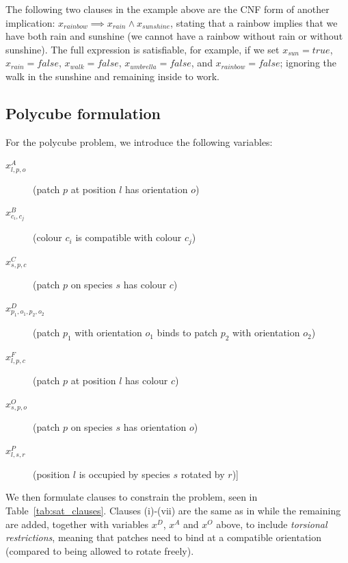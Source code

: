 The following two clauses in the example above are the CNF form of another implication: \(x_{rainbow} \implies  x_{rain} \land x_{sunshine}\), stating that a rainbow implies that we have both rain and sunshine (we cannot have a rainbow without rain or without sunshine). The full expression is satisfiable, for example, if we set \(x_{sun}=true\), \(x_{rain}=false\), \(x_{walk}=false\), \(x_{umbrella}=false\), and \(x_{rainbow}=false\); ignoring the walk in the sunshine and remaining inside to work.

\subsection{Polycube formulation}

For the polycube problem, we introduce the following variables:
\begin{description}
    \item[\(x_{l,p,o}^{A}\)] (patch \(p\) at position \(l\) has orientation \(o\))
    \item[\(x_{c_i,c_j}^{B}\)] (colour \(c_i\) is compatible with colour \(c_j\))
    \item[\(x_{s,p,c}^{C}\)] (patch \(p\) on species \(s\) has colour \(c\))
    \item[\(x_{p_1,o_1,p_2,o_2}^{D}\)] (patch \(p_1\) with orientation \(o_1\) binds to patch \(p_2\) with orientation \(o_2\))
    \item[\(x_{l,p,c}^{F}\)] (patch \(p\) at position \(l\) has colour \(c\))
    \item[\(x_{s,p,o}^{O}\)] (patch \(p\) on species \(s\) has orientation \(o\))
    \item[\(x_{l,s,r}^{P}\)] (position \(l\) is occupied by species \(s\) rotated by \(r\))] 
\end{description}

We then formulate clauses to constrain the problem, seen in Table~\ref{tab:sat_clauses}. Clauses (i)-(vii) are the same as in \cite{romano2020designing} while the remaining are added, together with variables \(x^D\), \(x^A\) and \(x^O\) above, to include \emph{torsional restrictions}, meaning that patches need to bind at a compatible orientation (compared to being allowed to rotate freely).


